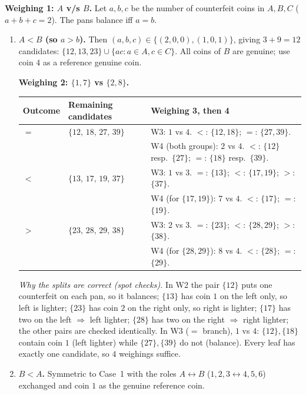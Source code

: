\documentclass[11pt,a4paper]{article}
\renewcommand{\arraystretch}{1.15}
\theoremstyle{definition}
\begin{document}
\textbf{Weighing 1: $A$ v/s $B$.} Let $a,b,c$ be the number of counterfeit coins in $A,B,C$ ($a+b+c=2$). The pans balance iff $a=b$.

\begin{enumerate}[label=\textbf{Case \arabic*.},leftmargin=*,itemsep=6pt]
\item \textbf{$A<B$ (so $a>b$).} Then $(a,b,c)\in\{(2,0,0),(1,0,1)\}$, giving $3+9=12$ candidates:
 $\{12,13,23\}\cup\{ac: a\in A,c\in C\}$. All coins of $B$ are genuine; use coin $4$ as a reference genuine coin.

\textbf{Weighing 2: $\{1,7\}$ vs $\{2,8\}$.}
\begin{center}\small
\renewcommand{\arraystretch}{1.2}
\begin{tabular}{@{}lll@{}}
\toprule
Outcome & Remaining candidates & Weighing 3, then 4 \\
\midrule
$=$ & $\{12,\,18,\,27,\,39\}$ & W3: $1$ vs $4$. $<$: $\{12,18\}$; $=$: $\{27,39\}$.\\
& & W4 (both groups): $2$ vs $4$. $<$: $\{12\}$ resp.\ $\{27\}$; $=$: $\{18\}$ resp.\ $\{39\}$.\\[2pt]
$<$ & $\{13,\,17,\,19,\,37\}$ & W3: $1$ vs $3$. $=$: $\{13\}$; $<$: $\{17,19\}$; $>$: $\{37\}$.\\
& & W4 (for $\{17,19\}$): $7$ vs $4$. $<$: $\{17\}$; $=$: $\{19\}$.\\[2pt]
$>$ & $\{23,\,28,\,29,\,38\}$ & W3: $2$ vs $3$. $=$: $\{23\}$; $<$: $\{28,29\}$; $>$: $\{38\}$.\\
& & W4 (for $\{28,29\}$): $8$ vs $4$. $<$: $\{28\}$; $=$: $\{29\}$.\\
\bottomrule
\end{tabular}
\end{center}
\textit{Why the splits are correct (spot checks).} In W2 the pair $\{12\}$ puts one counterfeit on each pan, so it balances; $\{13\}$ has coin $1$ on the left only, so left is lighter; $\{23\}$ has coin $2$ on the right only, so right is lighter; $\{17\}$ has two on the left $\Rightarrow$ left lighter; $\{28\}$ has two on the right $\Rightarrow$ right lighter; the other pairs are checked identically. In W3 ($=$ branch), $1$ vs $4$: $\{12\},\{18\}$ contain coin $1$ (left lighter) while $\{27\},\{39\}$ do not (balance). Every leaf has exactly one candidate, so $4$ weighings suffice.

\item \textbf{$B<A$.} Symmetric to Case~1 with the roles $A\leftrightarrow B$ ($1,2,3\leftrightarrow4,5,6$) exchanged and coin $1$ as the genuine reference coin.


\end{enumerate}
\end{document}
